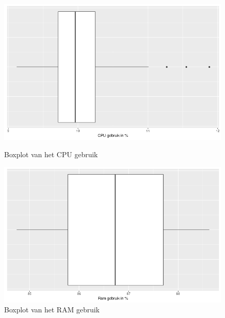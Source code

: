 \begin{figure}[ht]
	\centering
	\begin{minipage}[b]{0.45\linewidth}
		\includegraphics[width=\linewidth]{img/SC1_CPUBox.png}
		\caption{Boxplot van het CPU gebruik}
		\label{fig:SC1_CPUBox}
	\end{minipage}
	\quad
	\begin{minipage}[b]{0.45\linewidth}
		\includegraphics[width=\linewidth]{img/SC1_RAMBox.png}
		\caption{Boxplot van het RAM gebruik}
		\label{fig:SC1_RAMBox}
	\end{minipage}
\end{figure}
%
%

